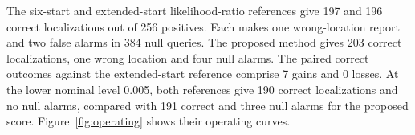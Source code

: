 The six-start and extended-start likelihood-ratio references give 197 and 196 correct localizations out of 256 positives. Each makes one wrong-location report and two false alarms in 384 null queries. The proposed method gives 203 correct localizations, one wrong location and four null alarms. The paired correct outcomes against the extended-start reference comprise 7 gains and 0 losses. At the lower nominal level 0.005, both references give 190 correct localizations and no null alarms, compared with 191 correct and three null alarms for the proposed score. Figure~\ref{fig:operating} shows their operating curves.
